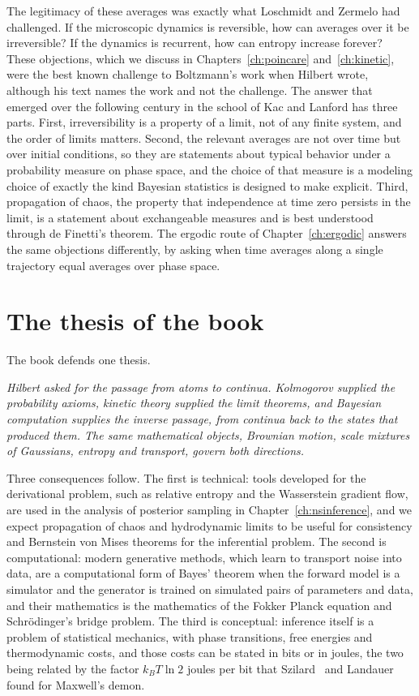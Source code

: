 The legitimacy of these averages was exactly what Loschmidt and Zermelo had challenged. If the microscopic dynamics is reversible, how can averages over it be irreversible? If the dynamics is recurrent, how can entropy increase forever? These objections, which we discuss in Chapters~\ref{ch:poincare} and~\ref{ch:kinetic}, were the best known challenge to Boltzmann's work when Hilbert wrote, although his text names the work and not the challenge. The answer that emerged over the following century in the school of Kac and Lanford has three parts. First, irreversibility is a property of a limit, not of any finite system, and the order of limits matters. Second, the relevant averages are not over time but over initial conditions, so they are statements about typical behavior under a probability measure on phase space, and the choice of that measure is a modeling choice of exactly the kind Bayesian statistics is designed to make explicit. Third, propagation of chaos, the property that independence at time zero persists in the limit, is a statement about exchangeable measures and is best understood through de Finetti's theorem. The ergodic route of Chapter~\ref{ch:ergodic} answers the same objections differently, by asking when time averages along a single trajectory equal averages over phase space.

\section{The thesis of the book}

The book defends one thesis.

\medskip
\noindent\emph{Hilbert asked for the passage from atoms to continua. Kolmogorov supplied the probability axioms, kinetic theory supplied the limit theorems, and Bayesian computation supplies the inverse passage, from continua back to the states that produced them. The same mathematical objects, Brownian motion, scale mixtures of Gaussians, entropy and transport, govern both directions.}

\medskip
Three consequences follow. The first is technical: tools developed for the derivational problem, such as relative entropy and the Wasserstein gradient flow, are used in the analysis of posterior sampling in Chapter~\ref{ch:nsinference}, and we expect propagation of chaos and hydrodynamic limits to be useful for consistency and Bernstein von Mises theorems for the inferential problem. The second is computational: modern generative methods, which learn to transport noise into data, are a computational form of Bayes' theorem when the forward model is a simulator and the generator is trained on simulated pairs of parameters and data, and their mathematics is the mathematics of the Fokker Planck equation and Schr\"odinger's bridge problem. The third is conceptual: inference itself is a problem of statistical mechanics, with phase transitions, free energies and thermodynamic costs, and those costs can be stated in bits or in joules, the two being related by the factor $k_BT\ln2$ joules per bit that Szilard~\cite{szilard1929} and Landauer~\cite{landauer1961} found for Maxwell's demon.

